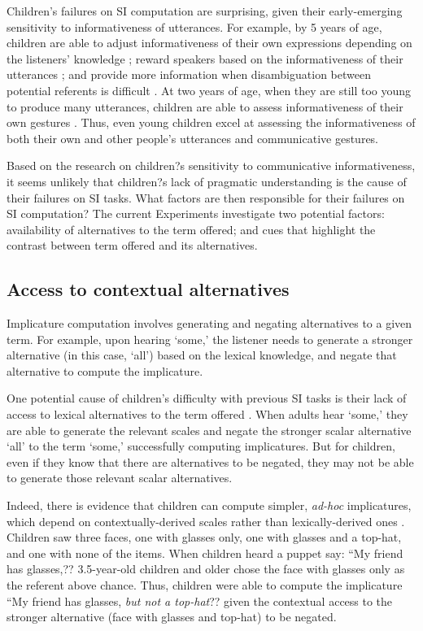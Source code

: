 \documentclass[10pt,letterpaper]{article}
\begin{document}
Children's failures on SI computation are surprising, given their early-emerging sensitivity to informativeness of utterances. For example, by 5 years of age, children are able to adjust informativeness of their own expressions depending on the listeners' knowledge \cite{matthews2006effect}; reward speakers based on the informativeness of their utterances \cite{katsos2011pragmatic}; and provide more information when disambiguation between potential referents is difficult \cite{matthews2012two}. At two years of age, when they are still too young to produce many utterances, children are able to assess informativeness of their own gestures \cite{o2001two}. Thus, even young children excel at assessing the informativeness of both their own and other people's utterances and communicative gestures. 

Based on the research on children?s sensitivity to communicative informativeness, it seems unlikely that children?s lack of pragmatic understanding is the cause of their failures on SI tasks. What factors are then responsible for their failures on SI computation? The current Experiments investigate two potential factors: availability of alternatives to the term offered; and cues that highlight the contrast between term offered and its alternatives. 

\subsection{Access to contextual alternatives}

Implicature computation involves generating and negating alternatives to a given term. For example, upon hearing `some,' the listener needs to generate a stronger alternative (in this case, `all') based on the lexical knowledge, and negate that alternative to compute the implicature.  

One potential cause of children's difficulty with previous SI tasks is their lack of access to lexical alternatives to the term offered \cite{barner2011accessing}. When adults hear `some,' they are able to generate the relevant scales and negate the stronger scalar alternative `all' to the term `some,' successfully computing implicatures. But for children, even if they know that there are alternatives to be negated, they may not be able to generate those relevant scalar alternatives. 

Indeed, there is evidence that children can compute simpler, \emph{ad-hoc} implicatures, which depend on contextually-derived scales rather than lexically-derived ones \cite{stillerLLD}. Children saw three faces, one with glasses only, one with glasses and a top-hat, and one with none of the items. When children heard a puppet say: ``My friend has glasses,?? 3.5-year-old children and older chose the face with glasses only as the referent above chance. Thus, children were able to compute the implicature ``My friend has glasses, \emph{but not a top-hat}?? given the contextual access to the stronger alternative (face with glasses and top-hat) to be negated. 
\end{document}
